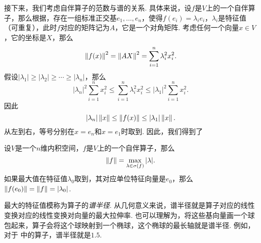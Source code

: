 接下来，我们考虑自伴算子的范数与谱的关系. 具体来说，设$f$是$V$上的一个自伴算子，那么根据，存在一组标准正交基$e_1,\dots,e_n$，使得$f(e_i)=\lambda_i e_i$，$\lambda_i$是特征值（可重复），此时$f$对应的矩阵记为$A$，它是一个对角矩阵. 考虑任何一个向量$x\in V$，它的坐标是$X$，那么
\[
    \left\|f(x)\right\|^2=\left\|AX\right\|^2=\sum_{i=1}^n\lambda_i^2x_i^2.
\]
假设$|\lambda_1|\geq|\lambda_2|\geq\cdots\geq|\lambda_n|$，那么
\[
    |\lambda_n|^2\sum_{i=1}^n x_i^2\leq \sum_{i=1}^n\lambda_i^2x_i^2\leq |\lambda_1|^2\sum_{i=1}^n x_i^2.
\]
因此
\[
    |\lambda_n|\left\|x\right\|\leq \left\|f(x)\right\|\leq |\lambda_1|\left\|x\right\|.
\]
从左到右，等号分别在$x=e_n$和$x=e_1$时取到. 因此，我们得到了

\begin{proposition}\label{prop:symmetric-operator-norm}
    设$V$是一个$n$维内积空间，$f$是$V$上的一个自伴算子，那么
    \[\left\|f\right\|=\max_{\lambda\in\sigma(f)}|\lambda|.\]
    如果最大值在特征值$\lambda_0$取到，其对应单位特征向量是$e_0$，那么$\left\|f(e_0)\right\|=\left\|f\right\|=|\lambda_0|$.
\end{proposition}

最大的特征值模称为算子的\emph{谱半径}. 从几何意义来说，谱半径就是算子对应的线性变换对应的线性变换对向量的最大拉伸率. 也可以理解为，将这些基向量画一个球包起来，算子会将这个球映射到一个椭球，这个椭球的最长轴就是谱半径. 例如，对于 中的算子，谱半径就是$1.5$. 